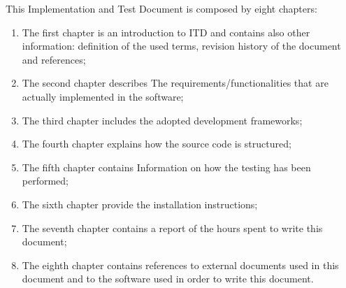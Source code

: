 This Implementation and Test Document is composed by eight chapters:
\begin{enumerate}
\item The first chapter is an introduction to ITD and contains also other information: definition of the used terms, revision history of the document and references;
\item The second chapter describes The
requirements/functionalities that are actually implemented in the software;
\item The third chapter includes the adopted
development frameworks;
\item The fourth chapter explains how the source code is structured;
\item The fifth chapter contains Information
on how the testing has been performed;
\item The sixth chapter provide the installation instructions;
\item The seventh chapter contains a report of the hours spent to write this document;
\item The eighth chapter contains references to external documents used in this document and to the software used in order to write this document.
\end{enumerate}
